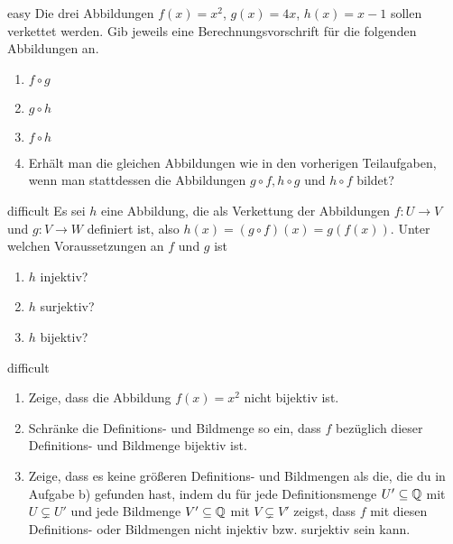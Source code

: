 \documentclass[../funktionen.tex]{subfiles}
\begin{document}
\begin{exercise}{easy}
    Die drei Abbildungen $f(x)=x^2$, $g(x)=4x$, $h(x)=x-1$ sollen verkettet werden. Gib jeweils eine Berechnungsvorschrift für die folgenden Abbildungen an.
    \begin{enumerate}
        \item $f\circ g$
        \item $g\circ h$
        \item $f\circ h$
        \item Erhält man die gleichen Abbildungen wie in den vorherigen Teilaufgaben, wenn man stattdessen die Abbildungen $g\circ f, h\circ g$ und $h\circ f$ bildet? 
    \end{enumerate}
\end{exercise}

\begin{exercise}{difficult}
    Es sei $h$ eine Abbildung, die als Verkettung der Abbildungen $f\colon U\rightarrow V$ und $g\colon V\rightarrow W$ definiert ist, also $h(x)=(g\circ f)(x)=g(f(x))$. Unter welchen Voraussetzungen an $f$ und $g$ ist
    \begin{enumerate}
        \item $h$ injektiv?
        \item $h$ surjektiv?
        \item $h$ bijektiv?
    \end{enumerate}
\end{exercise}

\begin{exercise}{difficult}
    \begin{enumerate}
        \item Zeige, dass die Abbildung $f(x)=x^2$ nicht bijektiv ist.
        \item Schränke die Definitions- und Bildmenge so ein, dass $f$ bezüglich dieser Definitions- und Bildmenge bijektiv ist.
        \item Zeige, dass es keine größeren Definitions- und Bildmengen als die, die du in Aufgabe b) gefunden hast, indem du für jede Definitionsmenge $U'\subseteq\mathbb{Q}$ mit $U\subsetneq U'$ und jede Bildmenge $V'\subseteq\mathbb{Q}$ mit $V\subsetneq V'$ zeigst, dass $f$ mit diesen Definitions- oder Bildmengen nicht injektiv bzw. surjektiv sein kann.
    \end{enumerate}
\end{exercise}
\end{document}

